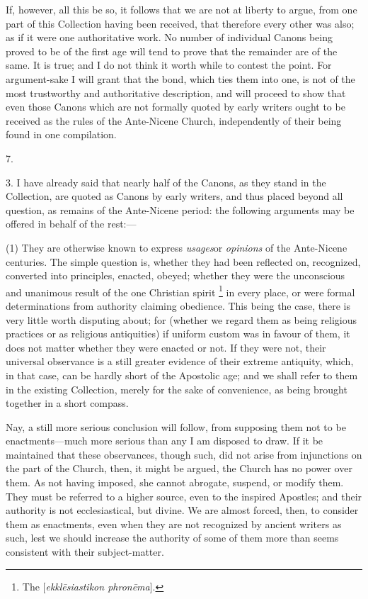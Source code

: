 If, however, all this be so, it follows that we are not at liberty
to argue, from one part of this Collection having been received, that
therefore every other was also; as if it were one authoritative work.
No number of individual Canons being proved to be of the first age
will tend to prove that the remainder are of the same. It is true;
and I do not think it worth while to contest the point. For
argument-sake I will grant that the bond, which ties them into one, is
not of the most trustworthy and authoritative description, and will
proceed to show that even those Canons which are not formally quoted
by early writers ought to be received as the rules of the Ante-Nicene
Church, independently of their being found in one compilation.

7.

3. I have already said that nearly half of the Canons, as they
stand in the Collection, are quoted as Canons by early writers, and
thus placed beyond all question, as remains of the Ante-Nicene period:
the following arguments may be offered in behalf of the rest:—

(1) They are otherwise known to express \emph{usages}or \emph{opinions}
of the Ante-Nicene centuries. The simple question is, whether they had
been reflected on, recognized, converted into principles, enacted,
obeyed; whether they were the unconscious and unanimous result of the
one Christian spirit \footnote{The [\emph{ekkl\={e}siastikon
phron\={e}ma}].} in
every place, or were formal determinations from authority claiming
obedience. This being the case, there is very little worth disputing
about; for (whether we regard them as being religious practices or as
religious antiquities) if uniform custom was in favour of them, it
does not matter whether they were enacted or not. If they were not,
their universal observance is a still greater evidence of their
extreme antiquity, which, in that case, can be hardly short of the
Apostolic age; and we shall refer to them in the existing Collection,
merely for the sake of convenience, as being brought together in a
short compass.

Nay, a still more serious conclusion will follow, from supposing them not to be enactments—much more serious than any I am
disposed to draw. If it be maintained that these observances, though
such, did not arise from injunctions on the part of the Church, then,
it might be argued, the Church has no power over them. As not having
imposed, she cannot abrogate, suspend, or modify them. They must be
referred to a higher source, even to the inspired Apostles; and their
authority is not ecclesiastical, but divine. We are almost forced,
then, to consider them as enactments, even when they are not
recognized by ancient writers as such, lest we should increase the
authority of some of them more than seems consistent with their
subject-matter.

